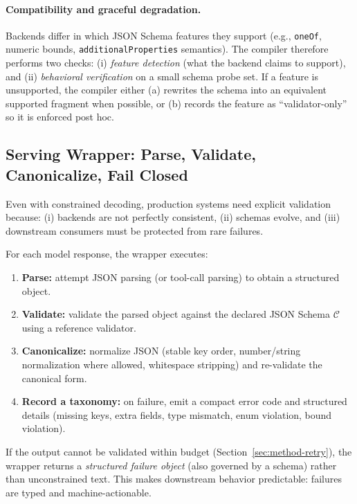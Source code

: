 \documentclass[11pt]{article}
\begin{document}
\paragraph{Compatibility and graceful degradation.}
Backends differ in which JSON Schema features they support (e.g., \texttt{oneOf}, numeric bounds, \texttt{additionalProperties} semantics).
The compiler therefore performs two checks:
(i) \emph{feature detection} (what the backend claims to support), and
(ii) \emph{behavioral verification} on a small schema probe set.
If a feature is unsupported, the compiler either (a) rewrites the schema into an equivalent supported fragment when possible, or (b) records the feature as ``validator-only'' so it is enforced post hoc.

\subsection{Serving Wrapper: Parse, Validate, Canonicalize, Fail Closed}

Even with constrained decoding, production systems need explicit validation because:
(i) backends are not perfectly consistent,
(ii) schemas evolve,
and (iii) downstream consumers must be protected from rare failures.

For each model response, the wrapper executes:

\begin{enumerate}[leftmargin=12pt]
    \item \textbf{Parse:} attempt JSON parsing (or tool-call parsing) to obtain a structured object.
    \item \textbf{Validate:} validate the parsed object against the declared JSON Schema $\mathcal{C}$ using a reference validator.
    \item \textbf{Canonicalize:} normalize JSON (stable key order, number/string normalization where allowed, whitespace stripping) and re-validate the canonical form.
    \item \textbf{Record a taxonomy:} on failure, emit a compact error code and structured details (missing keys, extra fields, type mismatch, enum violation, bound violation).
\end{enumerate}

If the output cannot be validated within budget (Section~\ref{sec:method-retry}), the wrapper returns a \emph{structured failure object} (also governed by a schema) rather than unconstrained text.
This makes downstream behavior predictable: failures are typed and machine-actionable.
\end{document}
